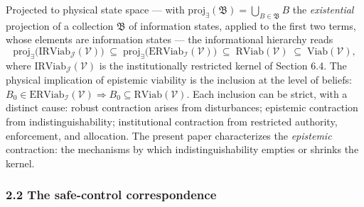 \documentclass[11pt]{article}
\theoremstyle{definition}
\begin{document}
Projected to physical state space --- with
\(\mathrm{proj}_{\exists}(\mathfrak{B}) = \bigcup_{B \in \mathfrak{B}} B\)
the \emph{existential} projection of a collection \(\mathfrak{B}\) of
information states, applied to the first two terms, whose elements are information states --- the informational hierarchy
reads
\[\mathrm{proj}_{\exists}\big(\mathrm{IRViab}_{\mathcal{J}}(\mathcal{V})\big) \;\subseteq\; \mathrm{proj}_{\exists}\big(\mathrm{ERViab}_{\mathcal{I}}(\mathcal{V})\big) \;\subseteq\; \mathrm{RViab}(\mathcal{V}) \;\subseteq\; \mathrm{Viab}(\mathcal{V}),\]
where \(\mathrm{IRViab}_{\mathcal{J}}(\mathcal{V})\) is the institutionally restricted kernel of Section 6.4. The physical implication of epistemic viability is the
inclusion at the level of beliefs:
\(B_0 \in \mathrm{ERViab}_{\mathcal{I}}(\mathcal{V}) \Rightarrow B_0 \subseteq \mathrm{RViab}(\mathcal{V})\).
Each inclusion can be strict, with a distinct cause: robust contraction
arises from disturbances; epistemic contraction from
indistinguishability; institutional contraction from restricted
authority, enforcement, and allocation. The present paper characterizes
the \emph{epistemic} contraction: the mechanisms by which
indistinguishability empties or shrinks the kernel.

\subsubsection{2.2 The safe-control
correspondence}\label{the-safe-control-correspondence}
\end{document}
